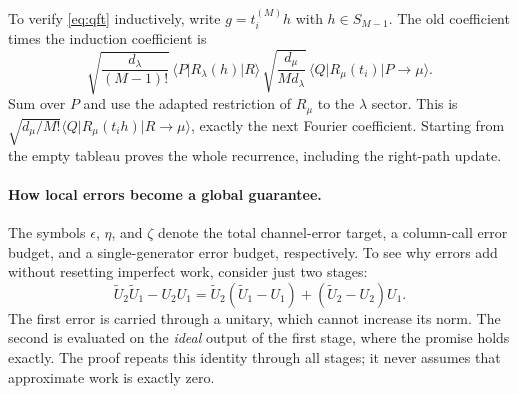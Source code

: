 \documentclass[11pt]{article}
\theoremstyle{definition}
\newcommand{\ket}[1]{\lvert #1\rangle}
\newcommand{\bra}[1]{\langle #1\rvert}
\begin{document}
To verify \eqref{eq:qft} inductively, write $g=t_i^{(M)}h$ with
$h\in S_{M-1}$. The old coefficient times the induction coefficient is
\[
 \sqrt{\frac{d_\lambda}{(M-1)!}}\,
 \bra P R_\lambda(h)\ket R\,
 \sqrt{\frac{d_\mu}{M d_\lambda}}\,
 \bra Q R_\mu(t_i)\ket{P\to\mu}.
\]
Sum over $P$ and use the adapted restriction of $R_\mu$ to the
$\lambda$ sector. This is
$\sqrt{d_\mu/M!}\bra Q R_\mu(t_i h)\ket{R\to\mu}$,
exactly the next Fourier coefficient. Starting from the empty tableau
proves the whole recurrence, including the right-path update.

\paragraph{How local errors become a global guarantee.}
The symbols $\epsilon$, $\eta$, and $\zeta$ denote the total channel-error
target, a column-call error budget, and a single-generator error budget,
respectively. To see why errors add without resetting imperfect work,
consider just two stages:
\[
 \widetilde U_2\widetilde U_1-U_2U_1
 =\widetilde U_2(\widetilde U_1-U_1)
   +(\widetilde U_2-U_2)U_1.
\]
The first error is carried through a unitary, which cannot increase its
norm. The second is evaluated on the \emph{ideal} output of the first
stage, where the promise holds exactly. The proof repeats this identity
through all stages; it never assumes that approximate work is exactly zero.
\end{document}

